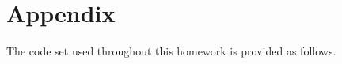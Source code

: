 \documentclass{assignment}
\begin{document}
\section*{Appendix}
The code set used throughout this homework is provided as follows. 

% 

% 


\nocite{*} 
\end{document}
